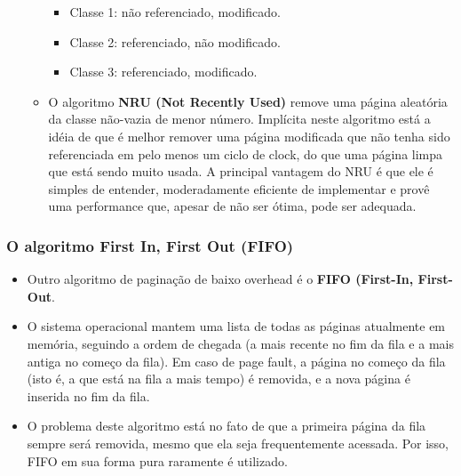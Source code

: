 \documentclass[10pt]{article}
\begin{document}
\begin{itemize}
\begin{itemize}
\begin{itemize}
                    \item Classe 1: não referenciado, modificado.
                    \item Classe 2: referenciado, não modificado.
                    \item Classe 3: referenciado, modificado.
                \end{itemize}
            \item O algoritmo \textbf{NRU (Not Recently Used)} remove uma página aleatória
                da classe não-vazia de menor número. Implícita neste algoritmo está a idéia
                de que é melhor remover uma página modificada que não tenha sido referenciada
                em pelo menos um ciclo de clock, do que uma página limpa que está sendo muito
                usada. A principal vantagem do NRU é que ele é simples de entender, moderadamente
                eficiente de implementar e provê uma performance que, apesar de não ser ótima,
                pode ser adequada.
        \end{itemize}
\end{itemize}
\subsubsection{O algoritmo First In, First Out (FIFO)}
\begin{itemize}
    \item Outro algoritmo de paginação de baixo overhead é o \textbf{FIFO (First-In,
        First-Out}. 
    \item O sistema operacional mantem uma lista de todas as páginas atualmente 
        em memória, seguindo a ordem de chegada (a mais recente no fim da fila
        e a mais antiga no começo da fila). Em caso de page fault, a página no começo
        da fila (isto é, a que está na fila a mais tempo) é removida, e a nova página
        é inserida no fim da fila.
    \item O problema deste algoritmo está no fato de que a primeira página da fila sempre
        será removida, mesmo que ela seja frequentemente acessada. Por isso, FIFO em
        sua forma pura raramente é utilizado.
\end{itemize}
\end{document}

